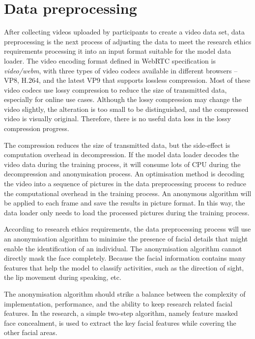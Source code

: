 \section{Data preprocessing}
\label{sec:Data preprocessing} %
After collecting videos uploaded by participants to create a video data set, data preprocessing is the next process of adjusting the data to meet the research ethics requirements processing it into an input format suitable for the model data loader.
The video encoding format defined in WebRTC specification is \textit{video/webm}, with three types of video codecs available in different browsers -- VP8, H.264, and the latest VP9 that supports lossless compression.
Most of these video codecs use lossy compression to reduce the size of transmitted data, especially for online use cases.
Although the lossy compression may change the video slightly, the alteration is too small to be distinguished, and the compressed video is visually original.
Therefore, there is no useful data loss in the lossy compression progress.

The compression reduces the size of transmitted data, but the side-effect is computation overhead in decompression.
If the model data loader decodes the video data during the training process, it will consume lots of CPU during the decompression and anonymisation process.
An optimisation method is decoding the video into a sequence of pictures in the data preprocessing process to reduce the computational overhead in the training process.
An anonymous algorithm will be applied to each frame and save the results in picture format.
In this way, the data loader only needs to load the processed pictures during the training process.

According to research ethics requirements, the data preprocessing process will use an anonymisation algorithm to minimise the presence of facial details that might enable the identification of an individual.
The anonymisation algorithm cannot directly mask the face completely.
Because the facial information contains many features that help the model to classify activities, such as the direction of sight, the lip movement during speaking, etc.

The anonymisation algorithm should strike a balance between the complexity of implementation, performance, and the ability to keep research related facial features.
In the research, a simple two-step algorithm, namely feature masked face concealment, is used to extract the key facial features while covering the other facial areas.

